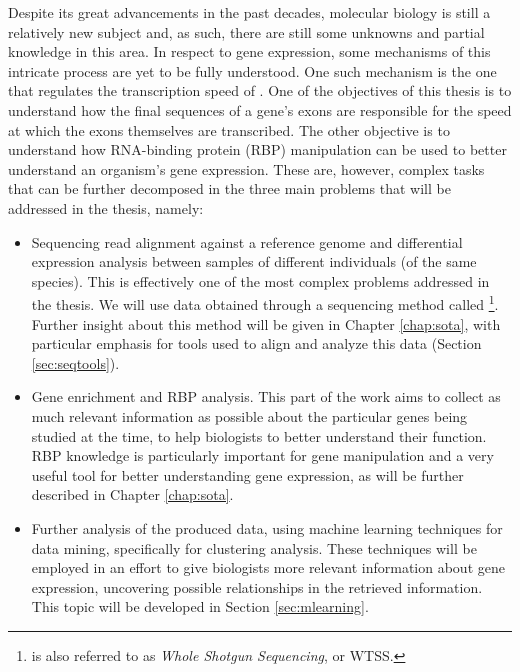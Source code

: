 Despite its great advancements in the past decades, molecular biology is still a
relatively new subject and, as such, there are still some unknowns and partial
knowledge in this area. In respect to gene expression, some mechanisms of this
intricate process are yet to be fully understood. One such mechanism is the one
that regulates the transcription speed of \rna. One of the objectives of this
thesis is to understand how the final sequences of a gene's exons are
responsible for the speed at which the exons themselves are transcribed. The
other objective is to understand how RNA-binding protein (RBP) manipulation can
be used to better understand an organism's gene expression. These are, however,
complex tasks that can be further decomposed in the three main problems that
will be addressed in the thesis, namely:

\begin{itemize}

  \item
  Sequencing read alignment against a reference genome and differential
  expression analysis between samples of different individuals (of the same
  species). This is effectively one of the most complex problems addressed in
  the thesis. We will use data obtained through a sequencing method called
  \rnaseq{}\footnote{\rnaseq{} is also referred to as \textit{Whole \Trans{}
  Shotgun Sequencing}, or WTSS.}. Further insight about this method will be
  given in Chapter \ref{chap:sota}, with particular emphasis for tools used to
  align and analyze this data (Section \ref{sec:seqtools}).

  \item
  Gene enrichment and RBP analysis. This part of the work aims to collect as
  much relevant information as possible about the particular genes being studied
  at the time, to help biologists to better understand their function. RBP
  knowledge is particularly important for gene manipulation and a very useful
  tool for better understanding gene expression, as will be further described in
  Chapter \ref{chap:sota}.

  \item
  Further analysis of the produced data, using machine learning techniques for
  data mining, specifically for clustering analysis. These techniques will be
  employed in an effort to give biologists more relevant information about gene
  expression, uncovering possible relationships in the retrieved information.
  This topic will be developed in Section \ref{sec:mlearning}.

\end{itemize}

